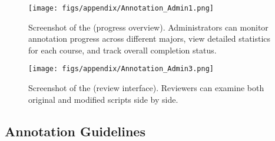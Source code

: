\begin{figure}[htbp]
    \centering
    \texttt{[image: figs/appendix/Annotation\_Admin1.png]}
    \caption{Screenshot of the  (progress overview). Administrators can monitor annotation progress across different majors, view detailed statistics for each course, and track overall completion status.}
    \label{fig:Annotation_Admin1}
\end{figure}

\begin{figure}[htbp]
    \centering
    \texttt{[image: figs/appendix/Annotation\_Admin3.png]}
    \caption{Screenshot of the  (review interface). Reviewers can examine both original and modified scripts side by side.}
    \label{fig:Annotation_Admin2}
\end{figure}







\clearpage
\subsection{Annotation Guidelines}
\label{sec:guide}


\noindent
\textbf{}

